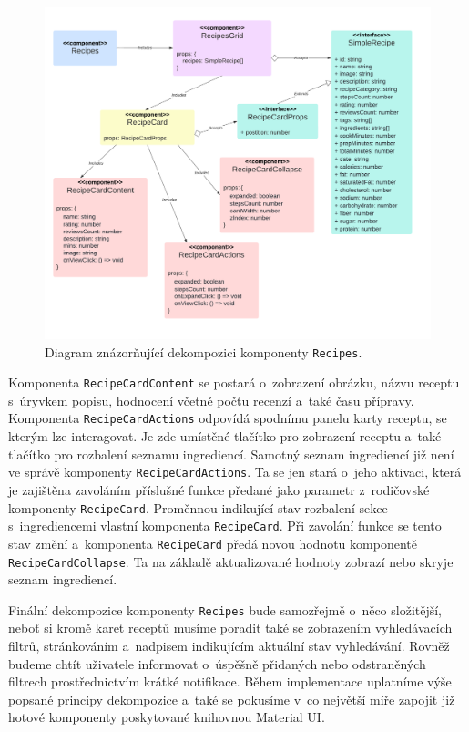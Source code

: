 \begin{figure}[h!]\centering
\includegraphics[width=145mm]{../img/recipes-component}
\caption{Diagram znázorňující dekompozici komponenty \texttt{Recipes}.}
\label{obr02:recipes-component}
\end{figure}

Komponenta \texttt{RecipeCardContent} se postará o~zobrazení obrázku, názvu receptu s~úryvkem popisu, hodnocení včetně počtu recenzí a~také času přípravy. Komponenta \texttt{RecipeCardActions} odpovídá spodnímu panelu karty receptu, se kterým lze interagovat. Je zde umístěné tlačítko pro zobrazení receptu a~také tlačítko pro rozbalení seznamu ingrediencí. Samotný seznam ingrediencí již není ve správě komponenty \texttt{RecipeCardActions}. Ta se jen stará o~jeho aktivaci, která je zajištěna zavoláním příslušné funkce předané jako parametr z~rodičovské komponenty \texttt{RecipeCard}. Proměnnou indikující stav rozbalení sekce s~ingrediencemi vlastní komponenta \texttt{RecipeCard}. Při zavolání funkce se tento stav změní a~komponenta \texttt{RecipeCard} předá novou hodnotu komponentě \texttt{RecipeCardCollapse}. Ta na základě aktualizované hodnoty zobrazí nebo skryje seznam ingrediencí.

Finální dekompozice komponenty \texttt{Recipes} bude samozřejmě o~něco složitější, neboť si kromě karet receptů musíme poradit také se zobrazením vyhledávacích filtrů, stránkováním a~nadpisem indikujícím aktuální stav vyhledávání. Rovněž budeme chtít uživatele informovat o~úspěšně přidaných nebo odstraněných filtrech prostřednictvím krátké notifikace. Během implementace uplatníme výše popsané principy dekompozice a~také se pokusíme v~co největší míře zapojit již hotové komponenty poskytované knihovnou Material UI.

